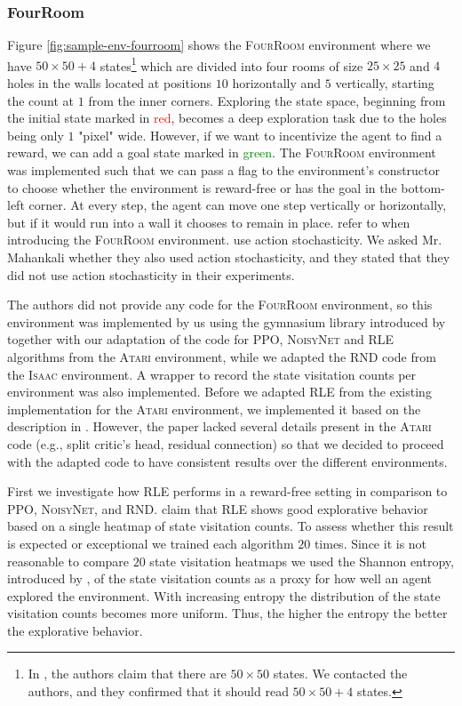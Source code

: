 \documentclass[10pt]{article} %
\begin{document}
\subsubsection{FourRoom}
Figure \ref{fig:sample-env-fourroom} shows the \textsc{FourRoom} environment where we have $50\times50 + 4$ states\footnote{In \cite{rle-paper}, the authors claim that there are $50\times 50$ states. We contacted the authors, and they confirmed that it should read $50\times 50 + 4$ states.} which are divided into four rooms of size $25\times25$ and $4$ holes in the walls located at positions $10$ horizontally and $5$ vertically, starting the count at $1$ from the inner corners. Exploring the state space, beginning from the initial state marked in \textcolor{red}{red}, becomes a deep exploration task due to the holes being only $1$ "pixel" wide. However, if we want to incentivize the agent to find a reward, we can add a goal state marked in \textcolor{green}{green}. The \textsc{FourRoom} environment was implemented such that we can pass a flag to the environment's constructor to choose whether the environment is reward-free or has the goal in the bottom-left corner. At every step, the agent can move one step vertically or horizontally, but if it would run into a wall it chooses to remain in place. \cite{rle-paper} refer to \cite{grid-world-paper} when introducing the \textsc{FourRoom} environment. \cite{grid-world-paper} use action stochasticity. We asked Mr. Mahankali whether they also used action stochasticity, and they stated that they did not use action stochasticity in their experiments. 

The authors did not provide any code for the \textsc{FourRoom} environment, so this environment was implemented by us using the gymnasium library introduced by \cite{gymnasium-paper} together with our adaptation of the code for \textsc{PPO}, \textsc{NoisyNet} and \textsc{RLE} algorithms from the \textsc{Atari} environment, while we adapted the \textsc{RND} code from the \textsc{Isaac} environment. A wrapper to record the state visitation counts per environment was also implemented. Before we adapted \textsc{RLE} from the existing implementation for the \textsc{Atari} environment, we implemented it based on the description in \cite{rle-paper}. However, the paper lacked several details present in the \textsc{Atari} code (e.g., split critic's head, residual connection) so that we decided to proceed with the adapted code to have consistent results over the different environments. 

First we investigate how \textsc{RLE} performs in a reward-free setting in comparison to \textsc{PPO}, \textsc{NoisyNet}, and \textsc{RND}. \cite{rle-paper} claim that \textsc{RLE} shows good explorative behavior based on a single heatmap of state visitation counts. To assess whether this result is expected or exceptional we trained each algorithm $20$ times. Since it is not reasonable to compare $20$ state visitation heatmaps we used the Shannon entropy, introduced by \cite{shannon-entropy-paper}, of the state visitation counts as a proxy for how well an agent explored the environment. With increasing entropy the distribution of the state visitation counts becomes more uniform. Thus, the higher the entropy the better the explorative behavior. 
\end{document}
